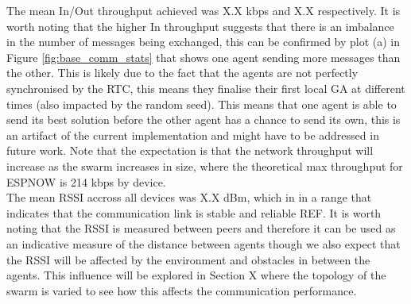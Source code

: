 \documentclass[conference]{IEEEtran}
\begin{document}
The mean In/Out throughput achieved was X.X kbps and X.X respectively. It is worth noting that the higher In throughput suggests that there is an imbalance in the number of messages being exchanged, this can be confirmed by plot (a) in Figure \ref{fig:base_comm_stats} that shows one agent sending more messages than the other. This is likely due to the fact that the agents are not perfectly synchronised by the RTC, this means they finalise their first local GA at different times (also impacted by the random seed). This means that one agent is able to send its best solution before the other agent has a chance to send its own, this is an artifact of the current implementation and might have to be addressed in future work. Note that the expectation is that the network throughput will increase as the swarm increases in size, where the theoretical max throughput for ESPNOW is 214 kbps by device.\\ 

The mean RSSI accross all devices was X.X dBm, which in in a range that indicates that the communication link is stable and reliable REF. It is worth noting that the RSSI is measured between peers and therefore it can be used as an indicative measure of the distance between agents though we also expect that the RSSI will be affected by the environment and obstacles in between the agents. This influence will be explored in Section X where the topology of the swarm is varied to see how this affects the communication performance.\\






\newpage
\printbibliography
\end{document}
